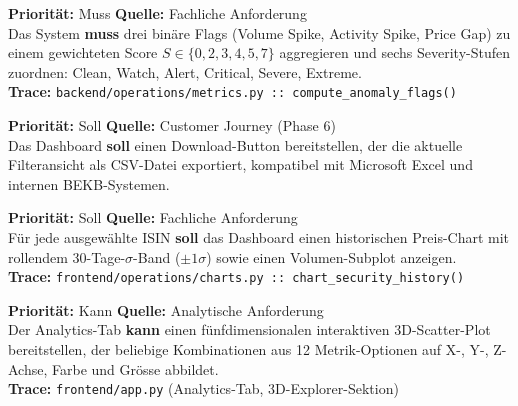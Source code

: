 \documentclass[12pt, a4paper, oneside]{report}
\newcommand{\code}[1]{\texttt{\small\textcolor{darknavy}{#1}}}
\begin{document}
\begin{reqbox}
\textbf{Priorit\"at:} Muss \quad \textbf{Quelle:} Fachliche Anforderung \\
Das System \textbf{muss} drei bin\"are Flags (Volume Spike, Activity Spike, Price Gap) zu einem gewichteten Score $S \in \{0,2,3,4,5,7\}$ aggregieren und sechs Severity-Stufen zuordnen: Clean, Watch, Alert, Critical, Severe, Extreme.\\[4pt]
\textbf{Trace:} \code{backend/operations/metrics.py :: compute\_anomaly\_flags()}
\end{reqbox}

\vspace{6pt}

\begin{reqbox}
\textbf{Priorit\"at:} Soll \quad \textbf{Quelle:} Customer Journey (Phase 6) \\
Das Dashboard \textbf{soll} einen Download-Button bereitstellen, der die aktuelle Filteransicht als CSV-Datei exportiert, kompatibel mit Microsoft Excel und internen BEKB-Systemen.
\end{reqbox}

\vspace{6pt}

\begin{reqbox}
\textbf{Priorit\"at:} Soll \quad \textbf{Quelle:} Fachliche Anforderung \\
F\"ur jede ausgew\"ahlte ISIN \textbf{soll} das Dashboard einen historischen Preis-Chart mit rollendem 30-Tage-$\sigma$-Band ($\pm 1\sigma$) sowie einen Volumen-Subplot anzeigen.\\[4pt]
\textbf{Trace:} \code{frontend/operations/charts.py :: chart\_security\_history()}
\end{reqbox}

\vspace{6pt}

\begin{reqbox}
\textbf{Priorit\"at:} Kann \quad \textbf{Quelle:} Analytische Anforderung \\
Der Analytics-Tab \textbf{kann} einen f\"unfdimensionalen interaktiven 3D-Scatter-Plot bereitstellen, der beliebige Kombinationen aus 12 Metrik-Optionen auf X-, Y-, Z-Achse, Farbe und Gr\"osse abbildet.\\[4pt]
\textbf{Trace:} \code{frontend/app.py} (Analytics-Tab, 3D-Explorer-Sektion)
\end{reqbox}
\end{document}
